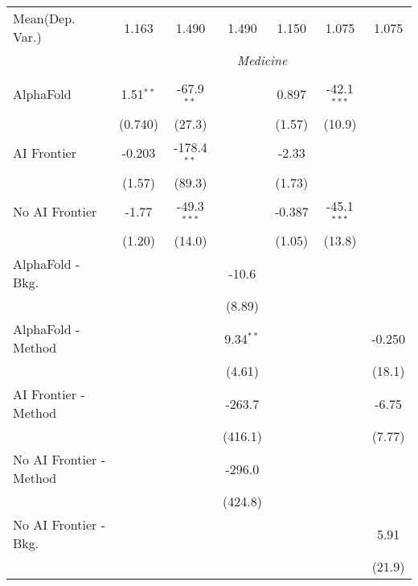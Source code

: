 \begin{tabular}{lcccccc}
Mean(Dep. Var.) & 1.163 & 1.490 & 1.490 & 1.150 & 1.075 & 1.075 \\
 & \multicolumn{6}{c}{\textit{Medicine}} \\ \\
   AlphaFold               & 1.51$^{**}$ & -67.9$^{**}$  &             & 0.897  & -42.1$^{***}$ &   \\   
                           & (0.740)     & (27.3)        &             & (1.57) & (10.9)        &   \\   
   AI Frontier             & -0.203      & -178.4$^{**}$ &             & -2.33  &               &   \\   
                           & (1.57)      & (89.3)        &             & (1.73) &               &   \\   
   No AI Frontier          & -1.77       & -49.3$^{***}$ &             & -0.387 & -45.1$^{***}$ &   \\   
                           & (1.20)      & (14.0)        &             & (1.05) & (13.8)        &   \\   
   AlphaFold - Bkg.        &             &               & -10.6       &        &               &   \\   
                           &             &               & (8.89)      &        &               &   \\   
   AlphaFold - Method      &             &               & 9.34$^{**}$ &        &               & -0.250\\   
                           &             &               & (4.61)      &        &               & (18.1)\\   
   AI Frontier - Method    &             &               & -263.7      &        &               & -6.75\\   
                           &             &               & (416.1)     &        &               & (7.77)\\   
   No AI Frontier - Method &             &               & -296.0      &        &               &   \\   
                           &             &               & (424.8)     &        &               &   \\   
   No AI Frontier - Bkg.   &             &               &             &        &               & 5.91\\   
                           &             &               &             &        &               & (21.9)\\   
   \midrule

\end{tabular}
